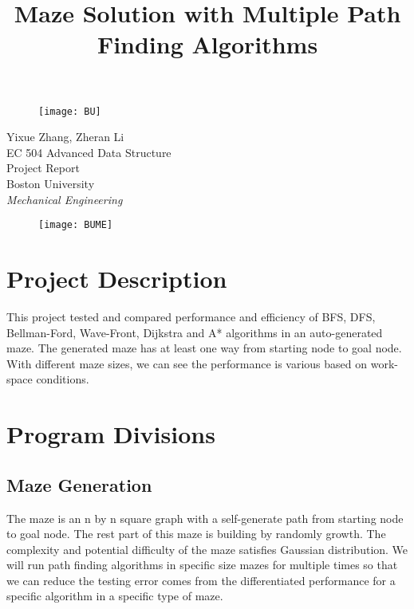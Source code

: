\documentclass[11pt, onecolumn, letterpaper]{article}
\begin{document}
\begin{titlepage}

\begin{figure}[htbp] 
\centering\texttt{[image: BU]}
\end{figure}
\begin{center}
\huge Yixue Zhang, Zheran Li\\
\vspace{6pt}
\LARGE EC 504 Advanced Data Structure\\
Project Report \\
\vspace{40pt}
\normalsize Boston University\\
\emph{Mechanical Engineering} \\

\end{center}
\begin{figure}[htbp] 
\centering\texttt{[image: BUME]}
\end{figure}

\end{titlepage}


\title{Maze Solution with Multiple Path Finding Algorithms}
\maketitle
\section{Project Description}
This project tested and compared performance and efficiency of BFS, DFS, Bellman-Ford, Wave-Front, Dijkstra and A* algorithms in an auto-generated maze.
The generated maze has at least one way from starting node to goal node. With different maze sizes, we can see the performance is various based on work-space conditions.
\section{Program Divisions}
\subsection{Maze Generation}
The maze is an n by n square graph with a self-generate path from starting node to goal node. The rest part of this maze is building by randomly growth. The complexity and potential difficulty of the maze satisfies Gaussian distribution. We will run path finding algorithms in specific size mazes for multiple times so that we can reduce the testing error comes from the differentiated performance for a specific algorithm in a specific type of maze.
\end{document}
